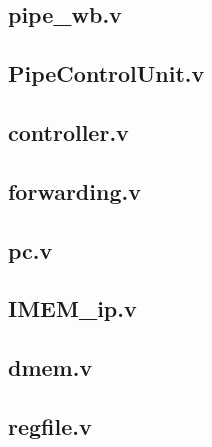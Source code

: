 \documentclass[12pt,a4paper]{article}
\begin{document}
\subsection{pipe\_wb.v}
\begingroup
\footnotesize
\linespread{0.8}\selectfont

\endgroup
\clearpage

\subsection{PipeControlUnit.v}
\begingroup
\footnotesize
\linespread{0.8}\selectfont

\endgroup
\clearpage

\subsection{controller.v}
\begingroup
\footnotesize
\linespread{0.8}\selectfont

\endgroup
\clearpage

\subsection{forwarding.v}
\begingroup
\footnotesize
\linespread{0.8}\selectfont

\endgroup
\clearpage

\subsection{pc.v}
\begingroup
\footnotesize
\linespread{0.8}\selectfont

\endgroup
\clearpage

\subsection{IMEM\_ip.v}
\begingroup
\footnotesize
\linespread{0.8}\selectfont

\endgroup
\clearpage

\subsection{dmem.v}
\begingroup
\footnotesize
\linespread{0.8}\selectfont

\endgroup
\clearpage

\subsection{regfile.v}
\begingroup
\footnotesize
\linespread{0.8}\selectfont

\endgroup
\clearpage
\end{document}
